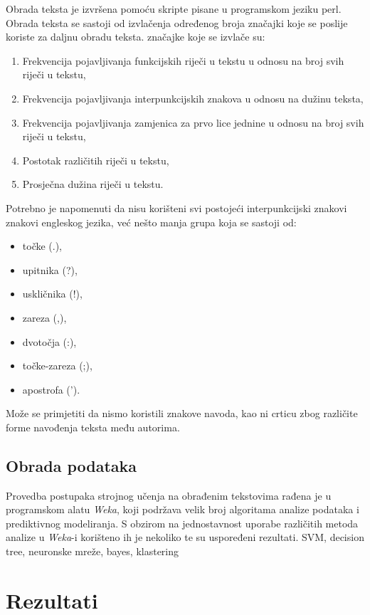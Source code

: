\documentclass[10pt, a4paper]{article}
\begin{document}
Obrada teksta je izvršena pomoću skripte pisane u programskom jeziku perl. Obrada teksta se sastoji od izvlačenja određenog broja značajki koje se poslije koriste za daljnu obradu teksta.
značajke koje se izvlače su:
\begin{enumerate}
\item Frekvencija pojavljivanja funkcijskih riječi u tekstu u odnosu na broj svih riječi u tekstu,
\item Frekvencija pojavljivanja interpunkcijskih znakova u odnosu na dužinu teksta,
\item Frekvencija pojavljivanja zamjenica za prvo lice jednine u odnosu na broj svih riječi u tekstu,
\item Postotak različitih riječi u tekstu,
\item Prosječna dužina riječi u tekstu.
\end{enumerate}
Potrebno je napomenuti da nisu korišteni svi postojeći interpunkcijski znakovi znakovi engleskog jezika, već nešto manja grupa koja se sastoji od:
\begin{itemize}
\item točke (.),
\item upitnika (?),
\item uskličnika (!),
\item zareza (,),
\item dvotočja (:),
\item točke-zareza (;),
\item apostrofa (').
\end{itemize}
Može se primjetiti da nismo koristili znakove navoda, kao ni crticu zbog različite forme navođenja teksta među autorima.

\subsection{Obrada podataka}

Provedba postupaka strojnog učenja na obrađenim tekstovima rađena je u programskom alatu \emph{Weka}, koji podržava velik broj algoritama analize podataka i prediktivnog modeliranja. S obzirom na jednostavnost uporabe različitih metoda analize u \emph{Weka}-i korišteno ih je nekoliko te su uspoređeni rezultati.  
SVM, decision tree, neuronske mreže, bayes, klastering

\section{Rezultati}
\end{document}

